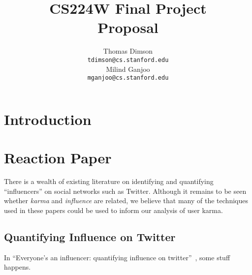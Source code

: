 \documentclass[11pt]{article}
\title{{\small CS224W Final Project} \\ Proposal}
\author{Thomas Dimson \\
  {\tt tdimson@cs.stanford.edu}
  \\\And
  Milind Ganjoo \\
  {\tt mganjoo@cs.stanford.edu}
}
\date{}
\newcommand{\titlecite}[2]{``#1''~\cite{#2}}
\begin{document}
\maketitle

\section{Introduction}

\section{Reaction Paper}
There is a wealth of existing literature on identifying and quantifying ``influencers''
on social networks such as Twitter. Although it remains to be seen whether \textit{karma} and
\textit{influence} are related, we believe that many of the techniques used in these papers
could be used to inform our analysis of user karma.

\subsection{Quantifying Influence on Twitter}
In \titlecite{Everyone's an influencer: quantifying influence on twitter}{bakshy2011everyone}, 
some stuff happens.

\end{document}
